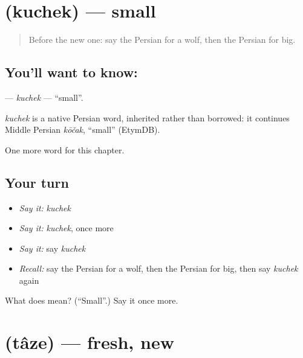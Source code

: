 \section[\texorpdfstring{\fa{کوچک} (kuchek)}{کوچک (kuchek)}]{ (kuchek) — small}

\label{lesson:FA-C58-kuchek}



\begin{quote}
Before the new one: say the Persian for a wolf, then the Persian for big.
\end{quote}

\subsection*{You'll want to know: }
\textbf{} — \emph{kuchek} — \textquotedblleft{}small\textquotedblright{}.

\begin{cousinweb}
\emph{kuchek} is a native Persian word, inherited rather than borrowed: it continues Middle Persian \emph{kōčak}, \textquotedblleft{}small\textquotedblright{} (EtymDB).
\end{cousinweb}

\begin{grammarlens}[title={What you've built}]
One more word for this chapter.
\end{grammarlens}

\subsection*{Your turn}
\begin{itemize}
\raggedright
  \item \emph{Say it:} \emph{kuchek}
  \item \emph{Say it:} \emph{kuchek}, once more
  \item \emph{Say it:} say \emph{kuchek}
  \item \emph{Recall:} say the Persian for a wolf, then the Persian for big, then say \emph{kuchek} again
\end{itemize}

\begin{tcolorbox}[breakable,colback=teal!4,colframe=teal!35!black,title={Before you move on}]
What does  mean? (\textquotedblleft{}Small\textquotedblright{}.) Say it once more.
\end{tcolorbox}
\section[\texorpdfstring{\fa{تازه} (tâze)}{تازه (tâze)}]{ (tâze) — fresh, new}

